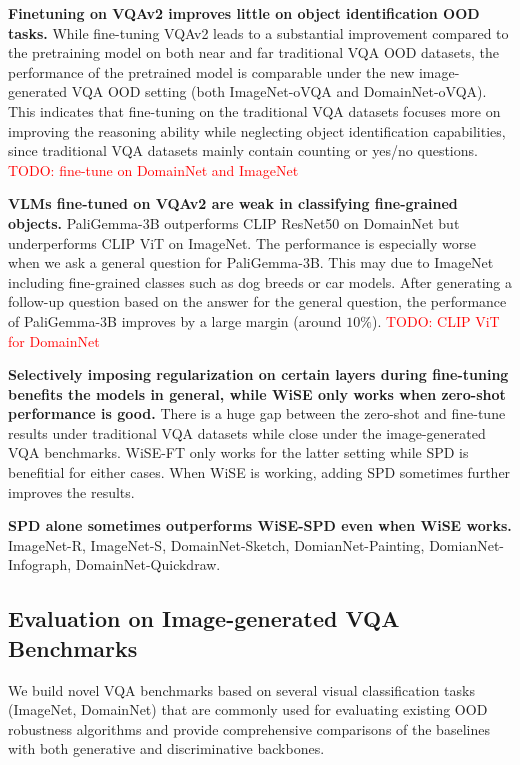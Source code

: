 



\textbf{Finetuning on VQAv2 improves little on object identification OOD tasks.} While fine-tuning VQAv2 leads to a substantial improvement compared to the pretraining model on both near and far traditional VQA OOD datasets, the performance of the pretrained model is comparable under the new image-generated VQA OOD setting (both ImageNet-oVQA and DomainNet-oVQA). This indicates that fine-tuning on the traditional VQA datasets focuses more on improving the reasoning ability while neglecting object identification capabilities, since traditional VQA datasets mainly contain counting or yes/no questions. \textcolor{red}{TODO: fine-tune on DomainNet and ImageNet}

\textbf{VLMs fine-tuned on VQAv2 are weak in classifying fine-grained objects.} PaliGemma-3B outperforms CLIP ResNet50 on DomainNet but underperforms CLIP ViT on ImageNet. The performance is especially worse when we ask a general question for PaliGemma-3B. This may due to ImageNet including fine-grained classes such as dog breeds or car models. After generating a follow-up question based on the answer for the general question, the performance of PaliGemma-3B improves by a large margin (around $10\%$). \textcolor{red}{TODO: CLIP ViT for DomainNet}

\textbf{Selectively imposing regularization on certain layers during fine-tuning benefits the models in general, while WiSE only works when zero-shot performance is good.} There is a huge gap between the zero-shot and fine-tune results under traditional VQA datasets while close under the image-generated VQA benchmarks. WiSE-FT only works for the latter setting while SPD is benefitial for either cases. When WiSE is working, adding SPD sometimes further improves the results. 

\textbf{SPD alone sometimes outperforms WiSE-SPD even when WiSE works.} ImageNet-R, ImageNet-S, DomainNet-Sketch, DomianNet-Painting, DomianNet-Infograph, DomainNet-Quickdraw.


\subsection{Evaluation on Image-generated VQA Benchmarks}
We build novel VQA benchmarks based on several visual classification tasks (ImageNet, DomainNet) that are commonly used for evaluating existing OOD robustness algorithms and provide comprehensive comparisons of the baselines with both generative and discriminative backbones. 

